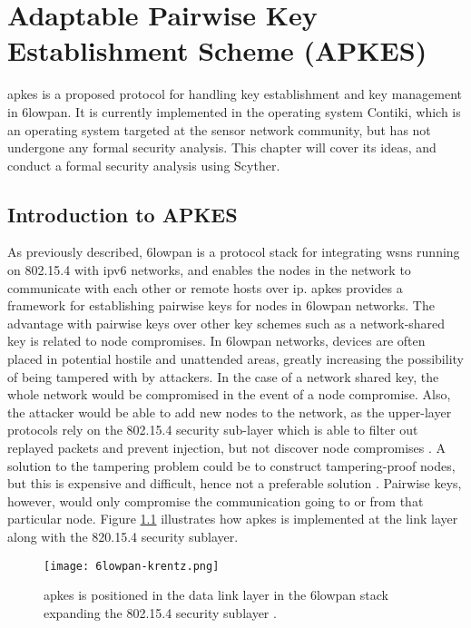 \chapter{Adaptable Pairwise Key Establishment Scheme (APKES)}
\label{chp:krentz-6lowpan}


\gls{apkes} is a proposed protocol for handling key establishment and key management in \gls{6lowpan}. It is currently implemented in the operating system Contiki, which is an operating system targeted at the sensor network community, but has not undergone any formal security analysis. This chapter will cover its ideas, and conduct a formal security analysis using Scyther. 

\section{Introduction to APKES}

As previously described, \gls{6lowpan} is a protocol stack for integrating \gls{wsn}s running on 802.15.4 with \gls{ip}v6 networks, and enables the nodes in the network to communicate with each other or remote hosts over \gls{ip}. \gls{apkes} provides a framework for establishing pairwise keys for nodes in \gls{6lowpan} networks. The advantage with pairwise keys over other key schemes such as a network-shared key is related to node compromises. In \gls{6lowpan} networks, devices are often placed in potential hostile and unattended areas, greatly increasing the possibility of being tampered with by attackers. In the case of a network shared key, the whole network would be compromised in the event of a node compromise. Also, the attacker would be able to add new nodes to the network, as the upper-layer protocols rely on the 802.15.4 security sub-layer which is able to filter out replayed packets and prevent injection, but not discover node compromises \cite{krentz20136lowpan}. A solution to the tampering problem could be to construct tampering-proof nodes, but this is expensive and difficult, hence not a preferable solution \cite{anderson1996tamper}. Pairwise keys, however, would only compromise the communication going to or from that particular node. Figure \ref{fig:6lowpan-krentz} illustrates how \gls{apkes} is implemented at the link layer along with the 820.15.4 security sublayer.

\begin{figure}
	\centering
	\texttt{[image: 6lowpan-krentz.png]}
	\caption{\gls{apkes} is positioned in the data link layer in the \gls{6lowpan} stack expanding the 802.15.4 security sublayer \cite{krentz20136lowpan}.}
	\label{fig:6lowpan-krentz}
\end{figure}

